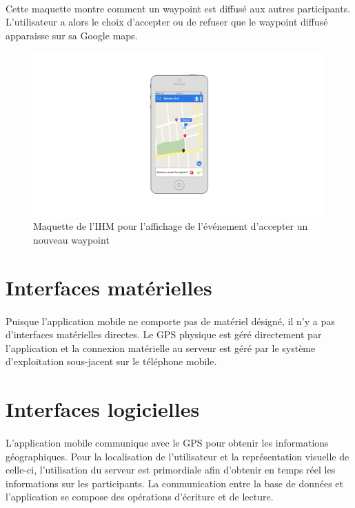 \documentclass[titlepage, 12pt]{report}
\begin{document}
\clearpage

\paragraph{}Cette maquette montre comment un waypoint est diffusé aux autres participants. L'utilisateur a alors le choix d'accepter ou de refuser que le waypoint diffusé apparaisse sur sa Google maps.

\begin{figure}[!h]
	\caption{Maquette de l'IHM pour l'affichage de l'événement d'accepter un nouveau waypoint}
	\label{accept_waypoint}
	\centering
	\includegraphics[scale=0.3]{images/mockups/accept_waypoint.png}
\end{figure}

\clearpage

\section{Interfaces matérielles}

\paragraph{}Puisque l'application mobile ne comporte pas de matériel désigné, il n'y a pas d'interfaces matérielles directes. Le GPS physique est géré directement par l'application et la connexion matérielle au serveur est géré par le système d'exploitation sous-jacent sur le téléphone mobile. 

\section{Interfaces logicielles}

\paragraph{}L'application mobile communique avec le GPS pour obtenir les informations géographiques. Pour la localisation de l'utilisateur et la représentation visuelle de celle-ci, l'utilisation du serveur est primordiale afin d'obtenir en temps réel les informations sur les participants.
La communication entre la base de données et l'application se compose des opérations d'écriture et de lecture.
\end{document}
